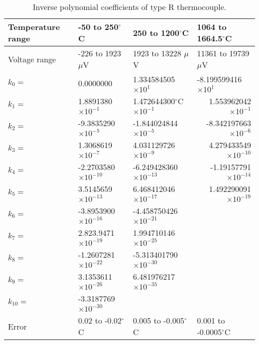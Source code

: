 \begin{table}[ht]
  \centering
  \small
  \caption{Inverse polynomial coefficients of type R thermocouple.}
    \begin{tabular}{lllr}
    \toprule
    Temperature range & -50 to 250$^{\circ}$C & 250 to 1200$^{\circ}$C & \multicolumn{1}{l}{1064 to 1664.5$^{\circ}$C} \\
    \midrule
    Voltage range & -226 to 1923 $\mu$V & 1923 to 13228 $\mu$V & \multicolumn{1}{l}{11361 to 19739 $\mu$V} \\
    \midrule
    $k_{0}=$ & 0.0000000 & 1.334584505$\times 10^{1}$ & \multicolumn{1}{l}{-8.199599416$\times 10^{1}$} \\
    $k_{1}=$ & 1.8891380$\times 10^{-1}$ & 1.472644300$^\circ$C$\times 10^{-1}$ & 1.553962042$\times 10^{-1}$ \\
    $k_{2}=$ & -9.3835290$\times 10^{-5}$ & -1.844024844$\times 10^{-5}$ & -8.342197663$\times 10^{-6}$ \\
    $k_{3}=$ & 1.3068619$\times 10^{-7}$ & 4.031129726$\times 10^{-9}$ & 4.279433549$\times 10^{-10}$ \\
    $k_{4}=$ & -2.2703580$\times 10^{-10}$ & -6.249428360$\times 10^{-13}$ & -1.19157791$\times 10^{-14}$ \\
    $k_{5}=$ & 3.5145659$\times 10^{-13}$ & 6.468412046$\times 10^{-17}$ & 1.492290091$\times 10^{-19}$ \\
    $k_{6}=$ & -3.8953900$\times 10^{-16}$ & -4.458750426$\times 10^{-21}$ & \multicolumn{1}{l}{} \\
    $k_{7}=$ & 2.823.9471$\times 10^{-19}$ & 1.994710146$\times 10^{-25}$ & \multicolumn{1}{l}{} \\
    $k_{8}=$ & -1.2607281$\times 10^{-22}$ & -5.313401790$\times 10^{-30}$ & \multicolumn{1}{l}{} \\
    $k_{9}=$ & 3.1353611$\times 10^{-26}$ & 6.481976217$\times 10^{-35}$ & \multicolumn{1}{l}{} \\
    $k_{10}=$ & -3.3187769$\times 10^{-30}$ &       & \multicolumn{1}{l}{} \\
    \midrule
    Error & 0.02 to -0.02$^{\circ}$C & 0.005 to -0.005$^{\circ}$C & \multicolumn{1}{l}{0.001 to -0.0005$^{\circ}$C} \\
    \bottomrule
    \end{tabular}%
  \label{tab:TypeRInversePolynomial}%
\end{table}%

